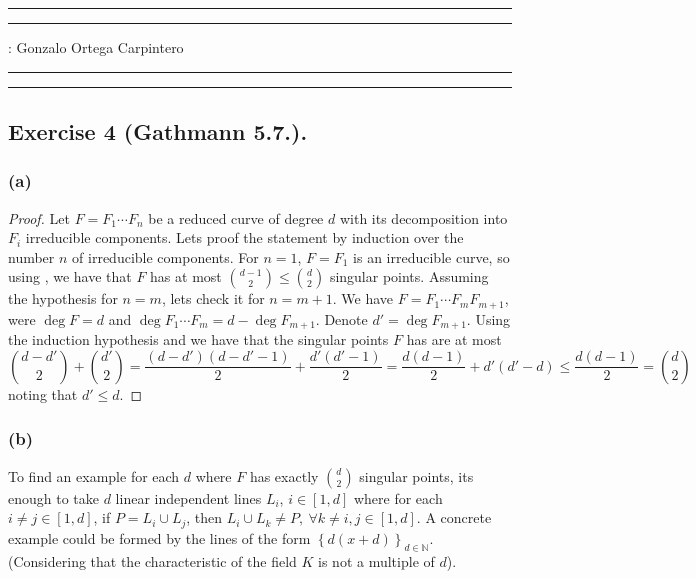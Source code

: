 \documentclass[11pt,a4paper]{article}
\begin{document}
\hrule\hrule
\vspace{1mm}


\vspace{1mm}

 : Gonzalo Ortega Carpintero
\vspace{2mm}

\hrule\hrule

\subsection*{Exercise 4 (Gathmann 5.7.).}
\subsubsection*{(a)}
\begin{proof}
  Let $ F = F_1 \cdots F_n $ be a reduced curve of degree 
  $ d $ with its decomposition into $ F_i $ irreducible components. Lets proof the statement by induction over the number $ n $ of irreducible components. For $ n = 1 $, $ F = F_1 $ is an irreducible curve, so using \cite[Proposition 5.6]{gath}, we have that $ F $ has at most $ \binom{d - 1}{2} \leq \binom{d}{2} $ singular points. Assuming the hypothesis for $ n = m $, lets check it for $ n = m+1$. We have $ F = F_1 \cdots F_m F_{m+1} $, were $ \deg F = d $ and $ \deg F_1 \cdots F_m = d - \deg F_{m+1} $. Denote $d' = \deg F_{m+1} $. Using the induction hypothesis and \cite[Remark 2.23]{gath} we have that the singular points $ F $ has are at most
  $$
    \binom{d-d'}{2} + \binom{d'}{2} = \frac{(d-d')(d-d'-1)}{2} + \frac{d'(d'-1)}{2} = \frac{d(d-1)}{2} + d'(d'-d) \leq \frac{d(d-1)}{2} = \binom{d}{2}
  $$
  noting that $ d' \leq d $.
\end{proof}

\subsubsection*{(b)}
To find an example for each $ d $ where $ F $ has exactly $ \binom{d}{2} $ singular points, its enough to take $ d $ linear independent lines $ L_i $, $ i \in [1, d] $ where for each $ i \neq j \in [1, d] $, if $ P = L_i \cup L_j $, then $ L_i \cup L_k \neq P, \ \forall k \neq i,j \in [1, d] $. A concrete example could be formed by the lines of the form $ \left\{d(x+d)\right\}_{d \in \mathbb N} $. (Considering that the characteristic of the field $ K $ is not a multiple of $ d $).
\end{document}
